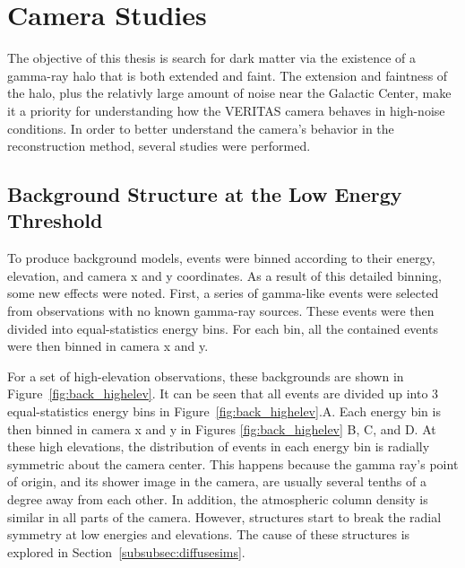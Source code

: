   \FloatBarrier

\section{Camera Studies}
  The objective of this thesis is search for dark matter via the existence of a gamma-ray halo that is both extended and faint.
  The extension and faintness of the halo, plus the relativly large amount of noise near the Galactic Center, make it a priority for understanding how the VERITAS camera behaves in high-noise conditions.
  In order to better understand the camera's behavior in the reconstruction method, several studies were performed.

  \subsection{Background Structure at the Low Energy Threshold}\label{subsec:bkgstructure}
    To produce background models, events were binned according to their energy, elevation, and camera x and y coordinates.
    As a result of this detailed binning, some new effects were noted.
    First, a series of gamma-like events were selected from observations with no known gamma-ray sources.
    These events were then divided into equal-statistics energy bins.
    For each bin, all the contained events were then binned in camera x and y.

    For a set of high-elevation observations, these backgrounds are shown in Figure~\ref{fig:back_highelev}.
    It can be seen that all events are divided up into 3 equal-statistics energy bins in Figure~\ref{fig:back_highelev}.A.
    Each energy bin is then binned in camera x and y in Figures \ref{fig:back_highelev} B, C, and D.
    At these high elevations, the distribution of events in each energy bin is radially symmetric about the camera center.
    This happens because the gamma ray's point of origin, and its shower image in the camera, are usually several tenths of a degree away from each other.
    In addition, the atmospheric column density is similar in all parts of the camera.
    However, structures start to break the radial symmetry at low energies and elevations.
    The cause of these structures is explored in Section~\ref{subsubsec:diffusesims}.

